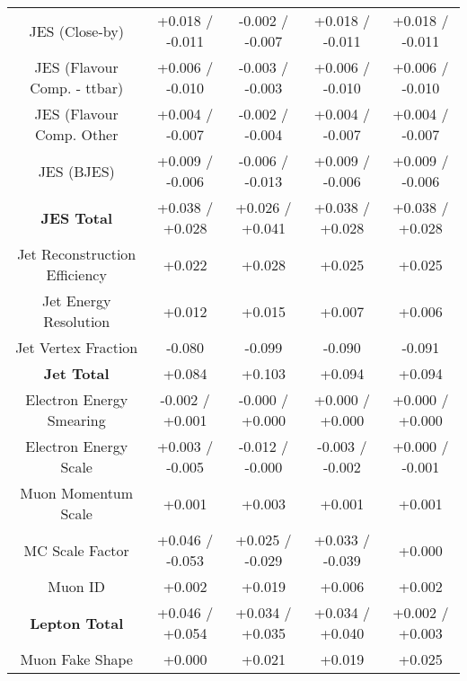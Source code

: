 \begin{table}[htbp]
\begin{center}
\begin{tabular}{|c|c|c|c|c|}
JES (Close-by)                        &+0.018   / -0.011   & -0.002   / -0.007   & +0.018   / -0.011   & +0.018   / -0.011  \\
JES (Flavour Comp. - ttbar)           &+0.006   / -0.010   & -0.003   / -0.003   & +0.006   / -0.010   & +0.006   / -0.010  \\
JES (Flavour Comp. Other              &+0.004   / -0.007   & -0.002   / -0.004   & +0.004   / -0.007   & +0.004   / -0.007  \\
JES (BJES)                            &+0.009   / -0.006   & -0.006   / -0.013   & +0.009   / -0.006   & +0.009   / -0.006  \\
\hline
\textbf{JES Total}                    &+0.038   / +0.028   & +0.026   / +0.041   & +0.038   / +0.028   & +0.038   / +0.028  \\
\hline
Jet Reconstruction Efficiency         &+0.022              & +0.028              & +0.025              & +0.025             \\
Jet Energy Resolution                 &+0.012              & +0.015              & +0.007              & +0.006             \\
Jet Vertex Fraction                   &-0.080              & -0.099              & -0.090              & -0.091             \\
\hline
\textbf{Jet Total}                    &+0.084              & +0.103              & +0.094              & +0.094             \\
\hline
Electron Energy Smearing              &-0.002   / +0.001   & -0.000   / +0.000   & +0.000   / +0.000   & +0.000   / +0.000  \\
Electron Energy Scale                 &+0.003   / -0.005   & -0.012   / -0.000   & -0.003   / -0.002   & +0.000   / -0.001  \\
Muon Momentum Scale                   &+0.001              & +0.003              & +0.001              & +0.001             \\
MC Scale Factor                       &+0.046   / -0.053   & +0.025   / -0.029   & +0.033   / -0.039   & +0.000             \\
Muon ID                               &+0.002              & +0.019              & +0.006              & +0.002             \\
\hline
\textbf{Lepton Total}                 &+0.046   / +0.054   & +0.034   / +0.035   & +0.034   / +0.040   & +0.002   / +0.003  \\
\hline
Muon Fake Shape                       &+0.000              & +0.021              & +0.019              & +0.025             \\

\end{tabular}
\end{center}
\end{table}
